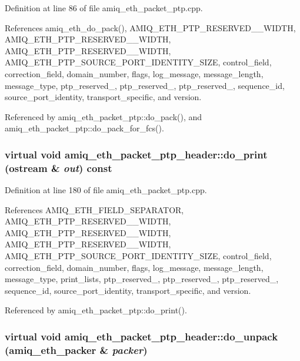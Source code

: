 Definition at line 86 of file amiq\_\-eth\_\-packet\_\-ptp.cpp.

References amiq\_\-eth\_\-do\_\-pack(), AMIQ\_\-ETH\_\-PTP\_\-RESERVED\_\_\-WIDTH, AMIQ\_\-ETH\_\-PTP\_\-RESERVED\_\_\-WIDTH, AMIQ\_\-ETH\_\-PTP\_\-RESERVED\_\_\-WIDTH, AMIQ\_\-ETH\_\-PTP\_\-SOURCE\_\-PORT\_\-IDENTITY\_\-SIZE, control\_\-field, correction\_\-field, domain\_\-number, flags, log\_\-message, message\_\-length, message\_\-type, ptp\_\-reserved\_, ptp\_\-reserved\_, ptp\_\-reserved\_, sequence\_\-id, source\_\-port\_\-identity, transport\_\-specific, and version.

Referenced by amiq\_\-eth\_\-packet\_\-ptp::do\_\-pack(), and amiq\_\-eth\_\-packet\_\-ptp::do\_\-pack\_\-for\_\-fcs().\hypertarget{classamiq__eth__packet__ptp__header_a2cf47a7607074bea8c5977e6beb26389}{
\subsubsection[{do\_\-print}]{\setlength{\rightskip}{0pt plus 5cm}virtual void amiq\_\-eth\_\-packet\_\-ptp\_\-header::do\_\-print (ostream \& {\em out}) const}}
\label{classamiq__eth__packet__ptp__header_a2cf47a7607074bea8c5977e6beb26389}


Definition at line 180 of file amiq\_\-eth\_\-packet\_\-ptp.cpp.

References AMIQ\_\-ETH\_\-FIELD\_\-SEPARATOR, AMIQ\_\-ETH\_\-PTP\_\-RESERVED\_\_\-WIDTH, AMIQ\_\-ETH\_\-PTP\_\-RESERVED\_\_\-WIDTH, AMIQ\_\-ETH\_\-PTP\_\-RESERVED\_\_\-WIDTH, AMIQ\_\-ETH\_\-PTP\_\-SOURCE\_\-PORT\_\-IDENTITY\_\-SIZE, control\_\-field, correction\_\-field, domain\_\-number, flags, log\_\-message, message\_\-length, message\_\-type, print\_\-lists, ptp\_\-reserved\_, ptp\_\-reserved\_, ptp\_\-reserved\_, sequence\_\-id, source\_\-port\_\-identity, transport\_\-specific, and version.

Referenced by amiq\_\-eth\_\-packet\_\-ptp::do\_\-print().\hypertarget{classamiq__eth__packet__ptp__header_a50b81480d0408ec14a9634e0bc888b4e}{
\subsubsection[{do\_\-unpack}]{\setlength{\rightskip}{0pt plus 5cm}virtual void amiq\_\-eth\_\-packet\_\-ptp\_\-header::do\_\-unpack ({\bf amiq\_\-eth\_\-packer} \& {\em packer})}}
\label{classamiq__eth__packet__ptp__header_a50b81480d0408ec14a9634e0bc888b4e}


